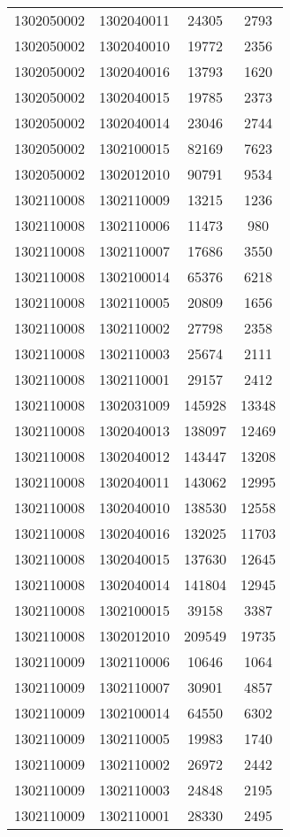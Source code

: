 \begin{longtable}[h]{llcc}
		1302050002 & 1302040011 & 24305 & 2793\\
		1302050002 & 1302040010 & 19772 & 2356\\
		1302050002 & 1302040016 & 13793 & 1620\\
		1302050002 & 1302040015 & 19785 & 2373\\
		1302050002 & 1302040014 & 23046 & 2744\\
		1302050002 & 1302100015 & 82169 & 7623\\
		1302050002 & 1302012010 & 90791 & 9534\\
		1302110008 & 1302110009 & 13215 & 1236\\
		1302110008 & 1302110006 & 11473 & 980\\
		1302110008 & 1302110007 & 17686 & 3550\\
		1302110008 & 1302100014 & 65376 & 6218\\
		1302110008 & 1302110005 & 20809 & 1656\\
		1302110008 & 1302110002 & 27798 & 2358\\
		1302110008 & 1302110003 & 25674 & 2111\\
		1302110008 & 1302110001 & 29157 & 2412\\
		1302110008 & 1302031009 & 145928 & 13348\\
		1302110008 & 1302040013 & 138097 & 12469\\
		1302110008 & 1302040012 & 143447 & 13208\\
		1302110008 & 1302040011 & 143062 & 12995\\
		1302110008 & 1302040010 & 138530 & 12558\\
		1302110008 & 1302040016 & 132025 & 11703\\
		1302110008 & 1302040015 & 137630 & 12645\\
		1302110008 & 1302040014 & 141804 & 12945\\
		1302110008 & 1302100015 & 39158 & 3387\\
		1302110008 & 1302012010 & 209549 & 19735\\
		1302110009 & 1302110006 & 10646 & 1064\\
		1302110009 & 1302110007 & 30901 & 4857\\
		1302110009 & 1302100014 & 64550 & 6302\\
		1302110009 & 1302110005 & 19983 & 1740\\
		1302110009 & 1302110002 & 26972 & 2442\\
		1302110009 & 1302110003 & 24848 & 2195\\
		1302110009 & 1302110001 & 28330 & 2495\\

\end{longtable}
